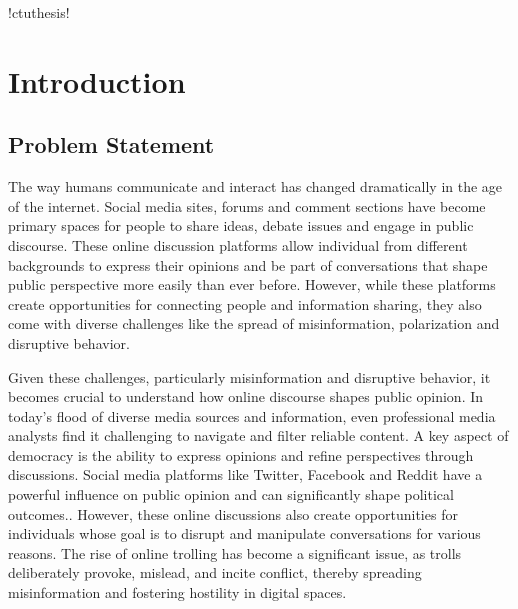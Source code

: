 \documentclass[twoside]{ctuthesis}
\theoremstyle{plain}
\theoremstyle{definition}
\theoremstyle{note}
\begin{document}
\renewcommand \ctulstsep{0pt}

\newcommand\ctuclsname{\leavevmode\unhcopy\ctuclsnamebox}
\newsavebox\ctuclsnamebox
\begin{lrbox}{\ctuclsnamebox}
\ctulst!ctuthesis!
\end{lrbox}

\maketitle

\chapter{Introduction}

\section{Problem Statement}
\par
The way humans communicate and interact has changed dramatically in the age of the internet. Social media sites, forums and comment sections have become primary spaces for people to share ideas, debate issues and engage in public discourse. These online discussion platforms allow individual from different backgrounds to express their opinions and be part of conversations that shape public perspective more easily than ever before. However, while these platforms create opportunities for connecting people and information sharing, they also come with diverse challenges like the spread of misinformation, polarization and disruptive behavior.\par

Given these challenges, particularly misinformation and disruptive behavior, it becomes crucial to understand how online discourse shapes public opinion. In today’s flood of diverse media sources and information, even professional media analysts find it challenging to navigate and filter reliable content. A key aspect of democracy is the ability to express opinions and refine perspectives through discussions. Social media platforms like Twitter, Facebook and Reddit have a powerful influence on public opinion and can significantly shape political outcomes.\cite{Bennett2012DigitalMedia}. However, these online discussions also create opportunities for individuals whose goal is to disrupt and manipulate conversations for various reasons. The rise of online trolling has become a significant issue, as trolls deliberately provoke, mislead, and incite conflict, thereby spreading misinformation and fostering hostility in digital spaces.\par
\end{document}
